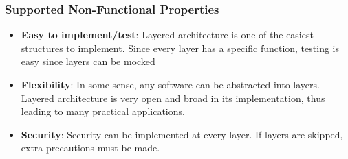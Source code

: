 \documentclass[11pt]{extarticle}
\begin{document}
\subsubsection{Supported Non-Functional Properties}
\begin{itemize}
    \item \textbf{Easy to implement/test}: Layered architecture is one of the easiest structures to implement.
    Since every layer has a specific function, testing is easy since layers can be mocked
    \item \textbf{Flexibility}: In some sense, any software can be abstracted into layers. Layered architecture is
    very open and broad in its implementation, thus leading to many practical applications.
    \item \textbf{Security}: Security can be implemented at every layer. If layers are skipped, extra precautions
    must be made.
\end{itemize}
\end{document}
